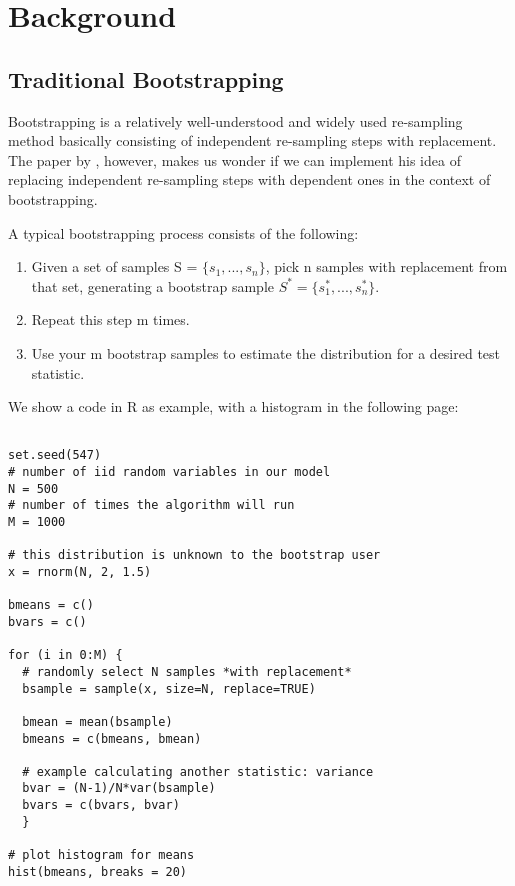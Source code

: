 

\section{Background}

\subsection{Traditional Bootstrapping}
Bootstrapping is a relatively well-understood and widely used re-sampling method basically consisting of independent re-sampling steps with replacement. The paper by %
 \Peskun, however, makes us wonder if we can implement his idea of replacing independent re-sampling steps with dependent ones in the context of bootstrapping.

A typical bootstrapping process consists of the following:

\begin{enumerate}[label=\alph*)]
\item Given a set of samples S = $\{s_1, ..., s_n\}$, pick n samples with replacement from that set, generating a bootstrap sample $S^* = \{s^*_1, ..., s^*_n\}$.

\item Repeat this step m times.

\item Use your m bootstrap samples to estimate the distribution for a desired test statistic.
\end{enumerate}

We show a code in R as example, with a histogram in the following page:


\begin{lstlisting}

set.seed(547)
# number of iid random variables in our model
N = 500
# number of times the algorithm will run 
M = 1000 

# this distribution is unknown to the bootstrap user
x = rnorm(N, 2, 1.5)

bmeans = c()
bvars = c()

for (i in 0:M) {
  # randomly select N samples *with replacement* 
  bsample = sample(x, size=N, replace=TRUE) 
  
  bmean = mean(bsample)
  bmeans = c(bmeans, bmean)
  
  # example calculating another statistic: variance
  bvar = (N-1)/N*var(bsample)
  bvars = c(bvars, bvar)
  }

# plot histogram for means
hist(bmeans, breaks = 20)
\end{lstlisting}

